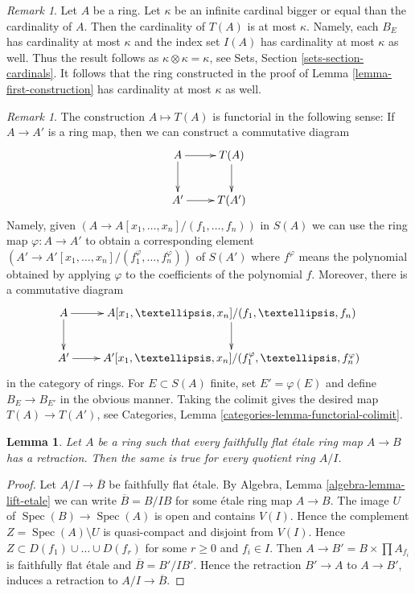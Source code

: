 \documentclass{stacks-project}
\theoremstyle{plain}
\newtheorem{lemma}[subsection]{Lemma}
\theoremstyle{definition}
\theoremstyle{remark}
\newtheorem{remark}[subsection]{Remark}
\numberwithin{equation}{subsection}
\def\Spec{\mathop{\mathrm{Spec}}}
\begin{document}
\begin{remark}
\label{remark-size-T}
Let $A$ be a ring. Let $\kappa$ be an infinite cardinal bigger or
equal than the cardinality of $A$. Then the cardinality of $T(A)$
is at most $\kappa$. Namely, each $B_E$ has cardinality at most
$\kappa$ and the index set $I(A)$ has cardinality at most $\kappa$
as well. Thus the result follows as $\kappa \otimes \kappa = \kappa$, see
Sets, Section \ref{sets-section-cardinals}. It follows that the
ring constructed in the proof of Lemma \ref{lemma-first-construction}
has cardinality at most $\kappa$ as well.
\end{remark}

\begin{remark}
\label{remark-first-construction-functorial}
The construction $A \mapsto T(A)$ is functorial in the following sense:
If $A \to A'$ is a ring map, then we can construct a commutative diagram
$$
\xymatrix{
A \ar[r] \ar[d] & T(A) \ar[d] \\
A' \ar[r] & T(A')
}
$$
Namely, given $(A \to A[x_1, \ldots, x_n]/(f_1, \ldots, f_n))$ in
$S(A)$ we can use the ring map $\varphi : A \to A'$ to obtain a corresponding
element $(A' \to A'[x_1, \ldots, x_n]/(f^\varphi_1, \ldots, f^\varphi_n))$
of $S(A')$ where $f^\varphi$ means the polynomial obtained by applying
$\varphi$ to the coefficients of the polynomial $f$.
Moreover, there is a commutative diagram
$$
\xymatrix{
A \ar[r] \ar[d] & A[x_1, \ldots, x_n]/(f_1, \ldots, f_n) \ar[d] \\
A' \ar[r] & A'[x_1, \ldots, x_n]/(f^\varphi_1, \ldots, f^\varphi_n)
}
$$
in the category of rings. For $E \subset S(A)$ finite, set
$E' = \varphi(E)$ and define $B_E \to B_{E'}$ in the obvious manner.
Taking the colimit gives the desired map $T(A) \to T(A')$, see
Categories, Lemma \ref{categories-lemma-functorial-colimit}.
\end{remark}

\begin{lemma}
\label{lemma-have-sections-quotient}
Let $A$ be a ring such that every faithfully flat \'etale ring map
$A \to B$ has a retraction. Then the same is true for every quotient ring
$A/I$.
\end{lemma}

\begin{proof}
Let $A/I \to \overline{B}$ be faithfully flat \'etale. By Algebra, Lemma
\ref{algebra-lemma-lift-etale} we can write $\overline{B} = B/IB$ for
some \'etale ring map $A \to B$. The image $U$ of $\Spec(B) \to \Spec(A)$
is open and contains $V(I)$. Hence the complement $Z = \Spec(A) \setminus U$
is quasi-compact and disjoint from $V(I)$. Hence
$Z \subset D(f_1) \cup \ldots \cup D(f_r)$ for some $r \geq 0$
and $f_i \in I$. Then $A \to B' = B \times \prod A_{f_i}$
is faithfully flat \'etale and $\overline{B} = B'/IB'$.
Hence the retraction $B' \to A$ to $A \to B'$, induces
a retraction to $A/I \to \overline{B}$.
\end{proof}
\end{document}

